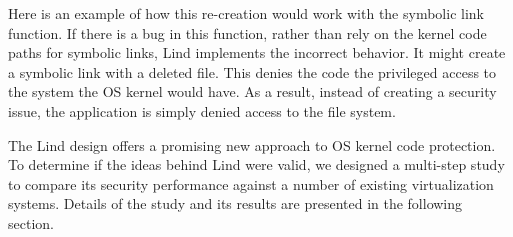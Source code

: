 Here is an example of how this re-creation would work with the symbolic link function.
If there is a bug in this function, rather than rely on the kernel code paths
for symbolic links, Lind implements the incorrect behavior. It might create a symbolic link
with a deleted file.
This denies the code the privileged access to the system the OS kernel would have.
As a result, instead of creating a security issue, the application is simply denied access
to the file system.

The Lind design offers a promising new approach to OS kernel code protection.
 To determine if the ideas behind Lind were valid, we
designed a multi-step study to compare its security performance against a number
 of existing virtualization systems. Details of the study and its results are presented
 in the following section.
